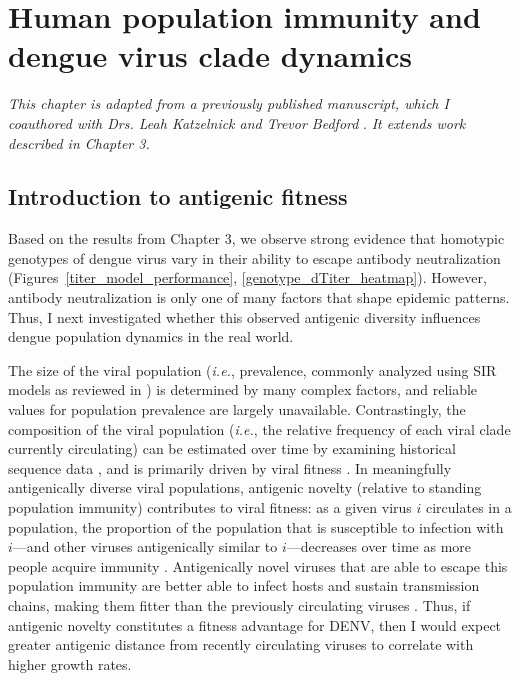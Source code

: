 
\chapter{Human population immunity and dengue virus clade dynamics}
\textit{This chapter is adapted from a previously published manuscript, which I coauthored with Drs. Leah Katzelnick and Trevor Bedford} \citep{bell2018dengue}. \textit{It extends work described in Chapter 3.}

\section{Introduction to antigenic fitness}
Based on the results from Chapter 3, we observe strong evidence that homotypic genotypes of dengue virus vary in their ability to escape antibody neutralization (Figures~\ref{titer_model_performance}, \ref{genotype_dTiter_heatmap}).
However, antibody neutralization is only one of many factors that shape epidemic patterns.
Thus, I next investigated whether this observed antigenic diversity influences dengue population dynamics in the real world.

The size of the viral population (\textit{i.e.}, prevalence, commonly analyzed using SIR models as reviewed in \citep{lourencco2018challenges}) is determined by many complex factors, and reliable values for population prevalence are largely unavailable.
Contrastingly, the composition of the viral population (\textit{i.e.}, the relative frequency of each viral clade currently circulating) can be estimated over time by examining historical sequence data \citep{lee2018deep,neher2016prediction}, and is primarily driven by viral fitness \citep{bedford2011strength}.
In meaningfully antigenically diverse viral populations, antigenic novelty (relative to standing population immunity) contributes to viral fitness: as a given virus $i$ circulates in a population, the proportion of the population that is susceptible to infection with $i$---and other viruses antigenically similar to $i$---decreases over time as more people acquire immunity \citep{bedford2012canalization, luksza2014predictive}.
Antigenically novel viruses that are able to escape this population immunity are better able to infect hosts and sustain transmission chains, making them fitter than the previously circulating viruses \citep{zhang2005clade, bedford2012canalization}.
Thus, if antigenic novelty constitutes a fitness advantage for DENV, then I would expect greater antigenic distance from recently circulating viruses to correlate with higher growth rates.


